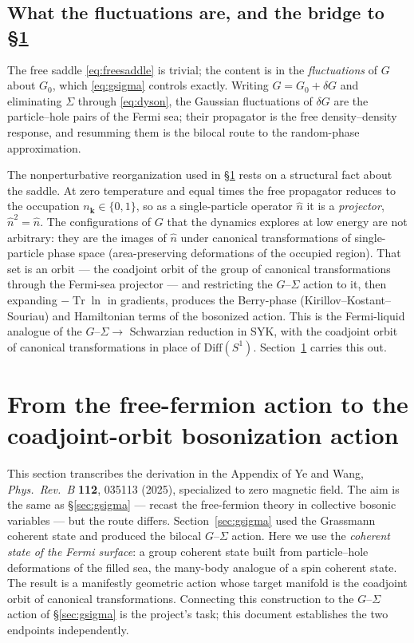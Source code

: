 \documentclass[11pt]{article}
\theoremstyle{remark}
\begin{document}
\subsection{What the fluctuations are, and the bridge to \texorpdfstring{\S\ref{sec:coadjoint}}{Section 2}}
\label{sec:bridge}

The free saddle \eqref{eq:freesaddle} is trivial; the content is in the
\emph{fluctuations} of $G$ about $G_0$, which \eqref{eq:gsigma} controls exactly.
Writing $G=G_0+\delta G$ and eliminating $\Sigma$ through \eqref{eq:dyson}, the
Gaussian fluctuations of $\delta G$ are the particle--hole pairs of the Fermi
sea; their propagator is the free density--density response, and resumming them
is the bilocal route to the random-phase approximation.

The nonperturbative reorganization used in \S\ref{sec:coadjoint} rests on a
structural fact about the saddle. At zero temperature and equal times the free
propagator reduces to the occupation $n_{\bm{k}}\in\{0,1\}$, so as a single-particle
operator $\hat n$ it is a \emph{projector}, $\hat n^2=\hat n$. The configurations
of $G$ that the dynamics explores at low energy are not arbitrary: they are the
images of $\hat n$ under canonical transformations of single-particle phase space
(area-preserving deformations of the occupied region). That set is an orbit ---
the coadjoint orbit of the group of canonical transformations through the
Fermi-sea projector --- and restricting the $G$--$\Sigma$ action to it, then
expanding $-\operatorname{Tr}\ln$ in gradients, produces the Berry-phase (Kirillov--Kostant--Souriau)
and Hamiltonian terms of the bosonized action. This is the Fermi-liquid analogue
of the $G$--$\Sigma\to$ Schwarzian reduction in SYK, with the coadjoint orbit of
canonical transformations in place of $\mathrm{Diff}(S^1)$. Section~\ref{sec:coadjoint}
carries this out.

\section{From the free-fermion action to the coadjoint-orbit bosonization action}
\label{sec:coadjoint}

This section transcribes the derivation in the Appendix of Ye and Wang,
\emph{Phys.\ Rev.\ B} \textbf{112}, 035113 (2025), specialized to zero magnetic
field. The aim is the same as \S\ref{sec:gsigma} --- recast the free-fermion
theory in collective bosonic variables --- but the route differs.
Section~\ref{sec:gsigma} used the Grassmann coherent state and produced the
bilocal $G$--$\Sigma$ action. Here we use the \emph{coherent state of the Fermi
surface}: a group coherent state built from particle--hole deformations of the
filled sea, the many-body analogue of a spin coherent state. The result is a
manifestly geometric action whose target manifold is the coadjoint orbit of
canonical transformations. Connecting this construction to the $G$--$\Sigma$
action of \S\ref{sec:gsigma} is the project's task; this document establishes the
two endpoints independently.
\end{document}
